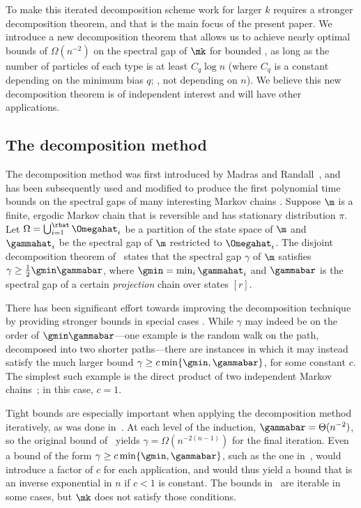 \documentclass{toc}
\begin{document}
To make this iterated decomposition scheme work for larger $k$ requires 
a stronger decomposition theorem, and that is the main focus of the 
present paper. We introduce a new decomposition theorem that allows us 
to achieve nearly optimal bounds of $\Omega(n^{-2})$ on the spectral 
gap of $\mk$ for bounded \kPs, as long as the number of particles of 
each type is at least $C_q\log n$ (where $C_q$ is a constant depending 
on the minimum bias $q$; \ie,  not depending on $n$).  We believe this 
new decomposition theorem is of independent interest and will have 
other applications.  

\subsection{The decomposition method}

The decomposition method was first introduced by Madras and 
Randall~\cite{madr}, and has been subsequently used and modified to 
produce the first polynomial time bounds on the spectral gaps of many 
interesting Markov chains \cite{CDF00,Dest03,Ding2010, EMT18, 
GHS08,HW16, jstv04,mh15,MR00,mrs,PS17, R01}. Suppose $\m$ is a finite, 
ergodic Markov chain that is reversible and has stationary 
distribution $\pi$. Let
%
$\Omega=\bigcup_{i=1}^{\rhat}\Omegahat_i$  %
be a partition of the state space of $\m$ and $\gammahat_i$ 
be the spectral gap of $\m$ restricted to $\Omegahat_i$. The disjoint 
decomposition theorem of~\cite{MR00} states that the spectral gap 
$\gamma$ of $\m$ satisfies $\gamma \geq \frac{1}{2}\gmin\gammabar$, 
where $\gmin=\min_i \gammahat_i$ and $\gammabar$ is the spectral gap of 
a certain \emph{projection} chain over states $[r]$. 

There has been significant effort towards improving the decomposition 
technique by providing stronger bounds in special 
cases \cite{Dest03,EMT18,GHS08,jstv04,mh15,MR00,PS17,R01}. While 
$\gamma$ may indeed be on the order of $\gmin\gammabar$---one example 
is the random walk on the path, decomposed into two
%
shorter  %
paths---there are instances in which it may instead satisfy the much 
larger bound $\gamma \geq c \min\{\gmin, \gammabar\}$, for some 
constant $c$. The simplest such example is the direct product of two 
independent Markov chains~\cite{bmrs,EMT18}; in this case, $c=1$. 

Tight bounds are especially important when applying the decomposition 
method iteratively, as was done in~\cite{MS}. At each level of the 
induction, $\gammabar=\Theta(n^{-2})$, so the original bound 
of~\cite{MR00} yields $\gamma=\Omega(n^{-2(n-1)})$ for the final 
iteration.   Even a bound of the form $\gamma \geq c \min\{\gmin, 
\gammabar\}$, such as the one in~\cite{PS17}, would introduce a factor 
of $c$ for each application, and would thus yield a bound that is an 
inverse exponential in $n$ if $c<1$ is constant. The bounds 
in~\cite{jstv04} are iterable in some cases, but $\mk$ does not satisfy 
those conditions.
\end{document}
